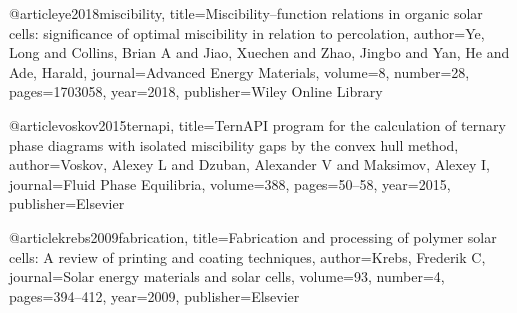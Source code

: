 @article{ye2018miscibility,
  title={Miscibility--function relations in organic solar cells: significance of optimal miscibility in relation to percolation},
  author={Ye, Long and Collins, Brian A and Jiao, Xuechen and Zhao, Jingbo and Yan, He and Ade, Harald},
  journal={Advanced Energy Materials},
  volume={8},
  number={28},
  pages={1703058},
  year={2018},
  publisher={Wiley Online Library}
}

@article{voskov2015ternapi,
  title={TernAPI program for the calculation of ternary phase diagrams with isolated miscibility gaps by the convex hull method},
  author={Voskov, Alexey L and Dzuban, Alexander V and Maksimov, Alexey I},
  journal={Fluid Phase Equilibria},
  volume={388},
  pages={50--58},
  year={2015},
  publisher={Elsevier}
}


@article{krebs2009fabrication,
  title={Fabrication and processing of polymer solar cells: A review of printing and coating techniques},
  author={Krebs, Frederik C},
  journal={Solar energy materials and solar cells},
  volume={93},
  number={4},
  pages={394--412},
  year={2009},
  publisher={Elsevier}
}

